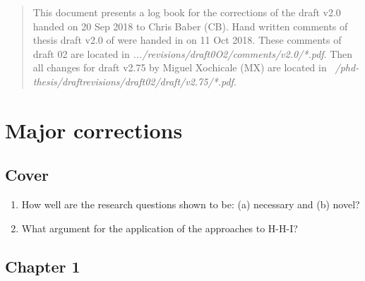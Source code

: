 \documentclass[10pt]{article}
\begin{document}
\maketitle



\begin{abstract}
This document presents a log book for the corrections 
of the draft v2.0 handed on 20 Sep 2018 to Chris Baber (CB).
Hand written comments of thesis draft v2.0 of were handed in on 
11 Oct 2018. 
These comments of draft 02 are located in 
\emph{.../revisions/draft0O2/comments/v2.0/*.pdf}.
Then all changes for draft v2.75 by Miguel Xochicale (MX)
are located in \emph{~/phd-thesis/draftrevisions/draft02/draft/v2.75/*.pdf}.
\end{abstract}

\tableofcontents
\newpage


%

\section{Major corrections}


\subsection{Cover}


\begin{enumerate}

\item How well are the research questions shown to be:
	(a) necessary and 
	(b) novel?

\item What argument for the application of the approaches to H-H-I?


\end{enumerate}



\subsection{Chapter 1}
\end{document}
